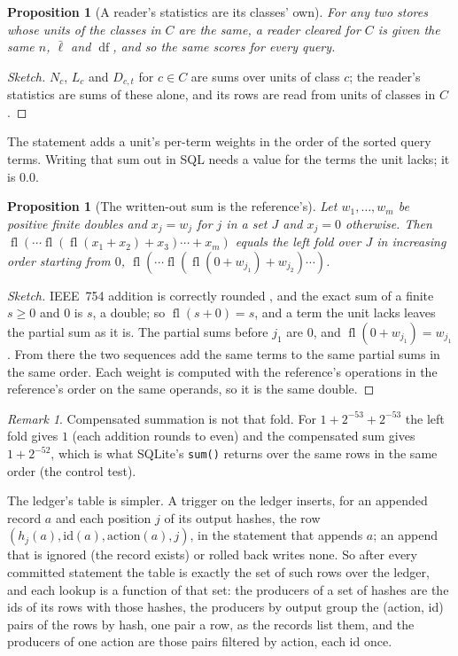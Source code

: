 \documentclass[11pt]{article}
\theoremstyle{plain}
\newtheorem{proposition}[theorem]{Proposition}
\theoremstyle{definition}
\theoremstyle{remark}
\newtheorem{remark}[theorem]{Remark}
\newcommand{\code}[1]{\texttt{#1}}
\newcommand{\fl}{\operatorname{fl}}
\newcommand{\df}{\operatorname{df}}
\begin{document}
\begin{proposition}[A reader's statistics are its classes' own]\label{prop:clearance}
For any two stores whose units of the classes in $C$ are the same, a reader cleared for $C$ is
given the same $n$, $\bar\ell$ and $\df$, and so the same scores for every query.
\end{proposition}

\begin{proof}[Sketch]
$N_c$, $L_c$ and $D_{c,t}$ for $c \in C$ are sums over units of class $c$; the reader's statistics
are sums of these alone, and its rows are read from units of classes in $C$.
\end{proof}

The statement adds a unit's per-term weights in the order of the sorted query terms. Writing that
sum out in SQL needs a value for the terms the unit lacks; it is $0.0$.

\begin{proposition}[The written-out sum is the reference's]\label{prop:sum}
Let $w_1, \dots, w_m$ be positive finite doubles and $x_j = w_j$ for $j$ in a set $J$ and
$x_j = 0$ otherwise. Then
$\fl(\cdots\fl(\fl(x_1 + x_2) + x_3)\cdots + x_m)$ equals the left fold over $J$ in increasing
order starting from $0$, $\fl(\cdots\fl(\fl(0 + w_{j_1}) + w_{j_2})\cdots)$.
\end{proposition}

\begin{proof}[Sketch]
IEEE~754 addition is correctly rounded \citep{ieee754-2019}, and the exact sum of a finite $s \ge 0$
and $0$ is $s$, a double; so $\fl(s + 0) = s$, and a term the unit lacks leaves the partial sum as
it is. The partial sums before $j_1$ are $0$, and $\fl(0 + w_{j_1}) = w_{j_1}$. From there the two
sequences add the same terms to the same partial sums in the same order. Each weight is computed
with the reference's operations in the reference's order on the same operands, so it is the same
double.
\end{proof}

\begin{remark}\label{rem:compensated}
Compensated summation is not that fold. For $1 + 2^{-53} + 2^{-53}$ the left fold gives $1$
(each addition rounds to even) and the compensated sum gives $1 + 2^{-52}$, which is what SQLite's
\code{sum()} returns over the same rows in the same order (the control test).
\end{remark}

The ledger's table is simpler. A trigger on the ledger inserts, for an appended record $a$ and
each position $j$ of its output hashes, the row $(h_j(a), \mathrm{id}(a), \mathrm{action}(a), j)$,
in the statement that appends $a$; an append that is ignored (the record exists) or rolled back
writes none. So after every committed statement the table is exactly the set of such rows over the
ledger, and each lookup is a function of that set: the producers of a set of hashes are the ids
of its rows with those hashes, the producers by output group the (action, id) pairs of the rows by
hash, one pair a row, as the records list them, and the producers of one action are those pairs
filtered by action, each id once.
\end{document}
